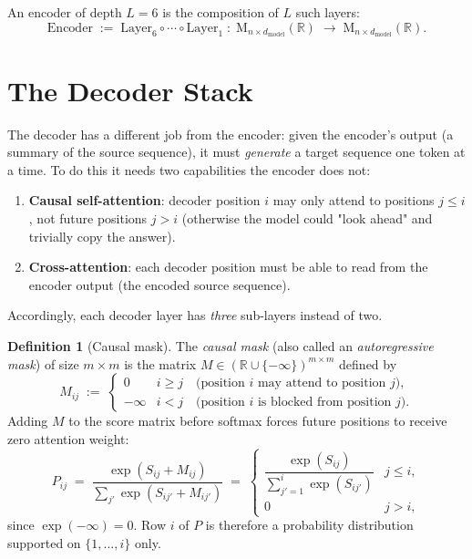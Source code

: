 \documentclass[11pt]{amsart}
\theoremstyle{plain}
\theoremstyle{definition}
\newtheorem{definition}[theorem]{Definition}
\newcommand{\R}{\mathbb{R}}
\newcommand{\Mat}[2]{\mathrm{M}_{#1 \times #2}(\R)}
\begin{document}
An encoder of depth $L = 6$ is the composition of $L$ such layers:
\[
    \mathrm{Encoder} \;:=\; \mathrm{Layer}_6 \circ \cdots \circ \mathrm{Layer}_1
    \;:\; \Mat{n}{d_{\mathrm{model}}} \;\to\; \Mat{n}{d_{\mathrm{model}}}.
\]

\section{The Decoder Stack}
\label{sec:decoder}

The decoder has a different job from the encoder: given the encoder's output
(a summary of the source sequence), it must \emph{generate} a target sequence
one token at a time.  To do this it needs two capabilities the encoder does not:
\begin{enumerate}[label=(\roman*)]
    \item \textbf{Causal self-attention}: decoder position $i$ may only attend
    to positions $j \leq i$, not future positions $j > i$ (otherwise the model
    could "look ahead" and trivially copy the answer).
    \item \textbf{Cross-attention}: each decoder position must be able to read
    from the encoder output (the encoded source sequence).
\end{enumerate}
Accordingly, each decoder layer has \emph{three} sub-layers instead of two.

\begin{definition}[Causal mask]
\label{def:causal-mask}
The \emph{causal mask} (also called an \emph{autoregressive mask}) of size
$m \times m$ is the matrix $M \in (\R \cup \{-\infty\})^{m \times m}$ defined by
\[
    M_{ij} \;:=\;
    \begin{cases}
        0      & i \geq j \quad \text{(position $i$ may attend to position $j$)}, \\
        -\infty & i < j  \quad \text{(position $i$ is blocked from position $j$)}.
    \end{cases}
\]
Adding $M$ to the score matrix before softmax forces future positions to
receive zero attention weight:
\[
    P_{ij} \;=\; \frac{\exp(S_{ij} + M_{ij})}{\sum_{j'} \exp(S_{ij'} + M_{ij'})}
    \;=\; \begin{cases}
        \dfrac{\exp(S_{ij})}{\sum_{j'=1}^{i}\exp(S_{ij'})} & j \leq i, \\[6pt]
        0 & j > i,
    \end{cases}
\]
since $\exp(-\infty) = 0$.  Row $i$ of $P$ is therefore a probability
distribution supported on $\{1,\ldots,i\}$ only.
\end{definition}
\end{document}

